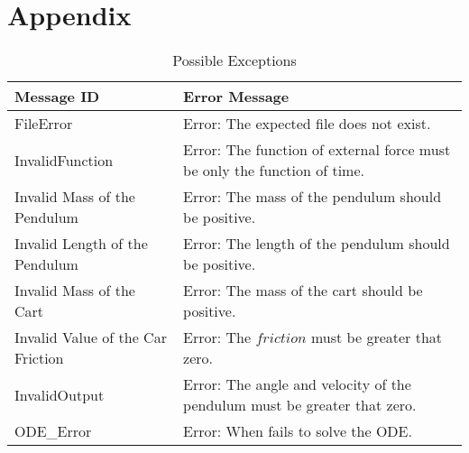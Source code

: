 \documentclass[12pt, titlepage]{article}
\begin{document}
\section{Appendix} \label{Appendix}
\begin{longtable}{l p{9cm}}
\caption{Possible Exceptions} \\
\toprule
\textbf{Message ID} & \textbf{Error Message} \\
\midrule
FileError & Error: The expected file does not exist. \\
InvalidFunction & Error: The function of external force must be only the function of time.\\
Invalid Mass of the Pendulum& Error: The mass of the pendulum should be positive.\\
Invalid Length of the Pendulum&Error: The length of the pendulum should be positive. \\
Invalid Mass of the Cart&Error: The mass of the cart should be positive.\\
Invalid Value of the Car Friction&Error: The $friction$ must be greater that zero.\\
InvalidOutput& Error: The angle and velocity of the pendulum must be greater that zero.\\
ODE\_Error&Error: When fails to solve the ODE.\\
\bottomrule
\end{longtable}
\end{document}
